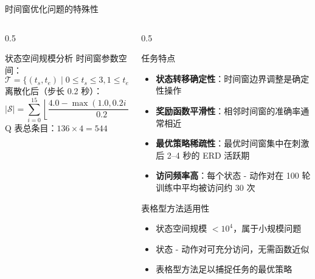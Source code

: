 \begin{frame}{时间窗优化问题的特殊性}
    \begin{columns}[t]
        \begin{column}{0.5\textwidth}
            \begin{block}{\normalsize 状态空间规模分析}
                \footnotesize
                时间窗参数空间：
                \[\mathcal{T} = \{(t_s, t_e) \mid 0 \leq t_s \leq 3, 1 \leq t_e \leq 4, t_e - t_s \geq 0.5\}\]
                离散化后（步长 0.2 秒）：
                \[|\mathcal{S}| = \sum_{i=0}^{15} \left\lfloor \frac{4.0 - \max(1.0, 0.2i + 0.5)}{0.2} \right\rfloor + 1 = 136\]
                Q 表总条目：$136 \times 4 = 544$
            \end{block}
        \end{column}

        \begin{column}{0.5\textwidth}
            \begin{alertblock}{\normalsize 任务特点}
                \footnotesize
                \begin{itemize}
                    \item \textbf{状态转移确定性}：时间窗边界调整是确定性操作
                    \item \textbf{奖励函数平滑性}：相邻时间窗的准确率通常相近
                    \item \textbf{最优策略稀疏性}：最优时间窗集中在刺激后 2–4 秒的 ERD 活跃期
                    \item \textbf{访问频率高}：每个状态 - 动作对在 100 轮训练中平均被访问约 30 次
                \end{itemize}
            \end{alertblock}


            \begin{exampleblock}{\normalsize 表格型方法适用性}
                \footnotesize
                \begin{itemize}
                    \item 状态空间规模 $< 10^4$，属于小规模问题
                    \item 状态 - 动作对可充分访问，无需函数近似
                    \item 表格型方法足以捕捉任务的最优策略
                \end{itemize}
            \end{exampleblock}
        \end{column}
    \end{columns}
\end{frame}

